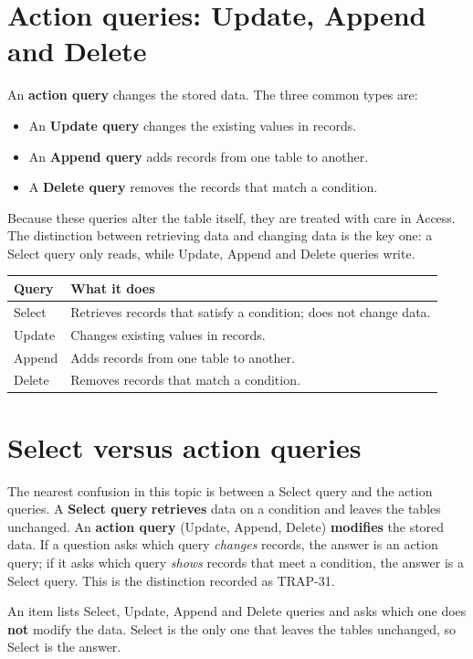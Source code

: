 \section{Action queries: Update, Append and Delete}
An \textbf{action query} changes the stored data. The three common types are:
\begin{itemize}
  \item An \textbf{Update query} changes the existing values in records.
  \item An \textbf{Append query} adds records from one table to another.
  \item A \textbf{Delete query} removes the records that match a condition.
\end{itemize}
Because these queries alter the table itself, they are treated with care in
Access. The distinction between retrieving data and changing data is the key
one: a Select query only reads, while Update, Append and Delete queries
write.

\begin{center}
\begin{tabular}{p{}p{}}
\toprule
\textbf{Query} & \textbf{What it does} \\
\midrule
Select & Retrieves records that satisfy a condition; does not change data. \\
Update & Changes existing values in records. \\
Append & Adds records from one table to another. \\
Delete & Removes records that match a condition. \\
\bottomrule
\end{tabular}
\end{center}

\section{Select versus action queries}
The nearest confusion in this topic is between a Select query and the action
queries. A \textbf{Select query} \textbf{retrieves} data on a condition and
leaves the tables unchanged. An \textbf{action query} (Update, Append,
Delete) \textbf{modifies} the stored data. If a question asks which query
\emph{changes} records, the answer is an action query; if it asks which query
\emph{shows} records that meet a condition, the answer is a Select query.
This is the distinction recorded as TRAP-31.

\begin{example}
An item lists Select, Update, Append and Delete queries and asks which one
does \textbf{not} modify the data. Select is the only one that leaves the
tables unchanged, so Select is the answer.
\end{example}

